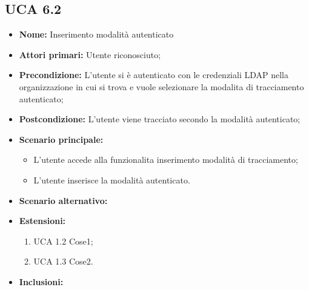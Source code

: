 \subsection{UCA 6.2}%
\begin{itemize}
	\item \textbf{Nome:} Inserimento modalità autenticato
	\item \textbf{Attori primari:} Utente riconosciuto;
	\item \textbf{Precondizione:} L'utente si è autenticato con le credenziali LDAP nella organizzazione in cui si trova e vuole selezionare la modalita di tracciamento autenticato;
	\item \textbf{Postcondizione:}  L'utente viene tracciato secondo la modalità autenticato;
	\item \textbf{Scenario principale:}
	\begin{itemize}
		\item L'utente accede alla funzionalita inserimento modalità di tracciamento;
		\item L'utente inserisce la modalità autenticato.
	\end{itemize}
	\item \textbf{Scenario alternativo:}
	\item \textbf{Estensioni:}
	\begin{enumerate}
		\item UCA 1.2 Cose1;
		\item UCA 1.3 Cose2.
	\end{enumerate}
	\item \textbf{Inclusioni:}
\end{itemize}
